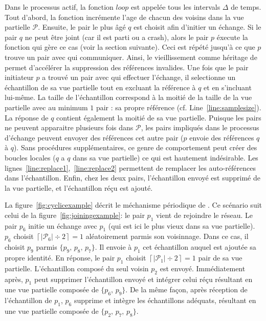Dans le processus actif, la fonction $loop$ est appelée tous les intervals
$\Delta$ de temps. Tout d'abord, la fonction incrémente l'age de chacun des
voisins dans la vue partielle $\mathcal{P}$. Ensuite, le pair le plus âgé $q$
est choisit afin d'initier un échange. Si le pair $q$ ne peut être joint (car il
est parti ou a crash), alors le pair $p$ éxecute la fonction qui gère ce cas
(voir la section suivante). Ceci est répété jusqu'à ce que $p$ trouve un pair
avec qui communiquer. Ainsi, le vieillissement comme héritage de \CYCLON permet
d'accélérer la suppression des références invalides. Une fois que le pair
initiateur $p$ a trouvé un pair avec qui effectuer l'échange, il selectionne un
échantillon de sa vue partielle tout en excluant la référence à $q$ et en
s'incluant lui-même. La taille de l'échantillon correspond à la moitié de la
taille de la vue partielle avec au minimum $1$ pair : sa propre référence
(cf. Line~\ref{line:samplesize}). La réponse de $q$ contient également la moitié
de sa vue partielle. Puisque les pairs ne peuvent apparaitre plusieurs fois dans
$\mathcal{P}$, les pairs impliqués dans le processus d'échange peuvent envoyer
des références cet autre pair ($p$ envoie des références $q$ à $q$). Sans
procédures supplémentaires, ce genre de comportement peut créer des boucles
locales ($q$ a $q$ dans sa vue partielle) ce qui est hautement indésirable. Les
lignes~\ref{line:replace1},~\ref{line:replace2} permettent de remplacer les
auto-références dans l'échantillon. Enfin, chez les deux pairs, l'échantillon envoyé 
est supprimé de la vue partielle, et l'échantillon réçu est ajouté.

La figure~\ref{fig:cyclicexample} décrit le méchanisme périodique de \SPRAY. Ce
scénario suit celui de la figure~\ref{fig:joiningexample}: le pair $p_1$ vient
de rejoindre le réseau. Le pair $p_6$ initie un échange avec $p_1$ (qui est ici
le plus vieux dans sa vue partielle). $p_6$ choisit
$\left\lceil{|\mathcal{P}_6|\div 2}\right\rceil = 1$ aléatoirement parmis son
voisinnage. Dans ce cas, il choisit $p_9$ parmis $\{p_9,\,p_8,\,p_7\}$. Il
envoie à $p_1$ cet échantillon auquel est ajoutée sa propre identité. En
réponse, le pair $p_1$ choisit
$\left\lceil{|\mathcal{P}_1|\div 2}\right\rceil = 1$ pair de sa vue
partielle. L'échantillon composé du seul voisin $p_2$ est envoyé. Immédiatement
après, $p_1$ peut supprimer l'échantillon envoyé et intégrer celui réçu
résultant en une vue partielle composée de $\{p_6,\, p_9\}$. De la même façon,
après réception de l'échantillon de $p_1$, $p_6$ supprime et intègre les
échantillons adéquats, résultant en une vue partielle composée de
$\{p_2,\,p_7,\,p_8\}$.

